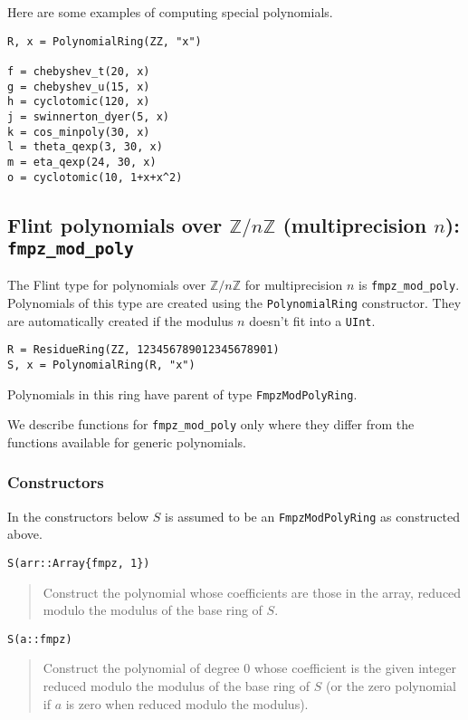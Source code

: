 \documentclass[a4paper,10pt]{article}
\newcommand{\Z}{\mathbb{Z}}
\newcommand{\code}{\lstinline}
\newcommand{\desc}[1]{\vspace{-3mm}\begin{quote}#1\end{quote}}
\begin{document}
{{Here are some examples of computing special polynomials.

\begin{lstlisting}
R, x = PolynomialRing(ZZ, "x")

f = chebyshev_t(20, x)
g = chebyshev_u(15, x)
h = cyclotomic(120, x)
j = swinnerton_dyer(5, x)
k = cos_minpoly(30, x)
l = theta_qexp(3, 30, x)
m = eta_qexp(24, 30, x)
o = cyclotomic(10, 1+x+x^2)
\end{lstlisting}

\subsection{Flint polynomials over $\Z/n\Z$ (multiprecision $n$): \code{fmpz_mod_poly}}

The Flint type for polynomials over $\Z/n\Z$ for multiprecision $n$ is \code{fmpz_mod_poly}.
Polynomials of this type are created using the \code{PolynomialRing} constructor. They are
automatically created if the modulus $n$ doesn't fit into a \code{UInt}.

\begin{lstlisting}
R = ResidueRing(ZZ, 123456789012345678901)
S, x = PolynomialRing(R, "x")
\end{lstlisting}

Polynomials in this ring have parent of type \code{FmpzModPolyRing}.

We describe functions for \code{fmpz_mod_poly} only where they differ from the functions
available for generic polynomials.

\subsubsection{Constructors}

In the constructors below $S$ is assumed to be an \code{FmpzModPolyRing} as constructed above.

\begin{lstlisting}
S(arr::Array{fmpz, 1})
\end{lstlisting}

\desc{Construct the polynomial whose coefficients are those in the array, reduced modulo the
modulus of the base ring of $S$.}

\begin{lstlisting}
S(a::fmpz)
\end{lstlisting}

\desc{Construct the polynomial of degree $0$ whose coefficient is the given integer reduced
modulo the modulus of the base ring of $S$ (or the zero polynomial if $a$ is zero when
reduced modulo the modulus).}

}}
\end{document}
